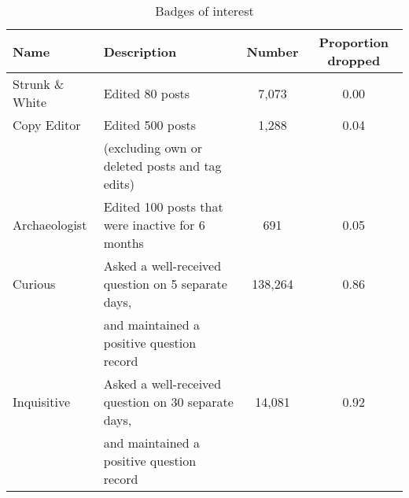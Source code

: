 \begin{table}
  \centering
  \begin{tabular}{@{}llcc@{}}
\toprule
    Name & Description & Number & Proportion dropped \\
\midrule
    Strunk \& White & Edited 80 posts & 7,073 & 0.00 \\
    Copy Editor & Edited 500 posts & 1,288 & 0.04 \\
                & (excluding own or deleted posts and tag edits) & & \\
    Archaeologist & Edited 100 posts that were inactive for 6 months & 691 & 0.05 \\
    Curious & Asked a well-received question on 5 separate days, & 138,264 & 0.86 \\
            & and maintained a positive question record & & \\
    Inquisitive & Asked a well-received question on 30 separate days, & 14,081 & 0.92 \\
                & and maintained a positive question record & & \\
\bottomrule
  \end{tabular}
  \caption{Badges of interest}
  \label{tab:badges}
\end{table}
